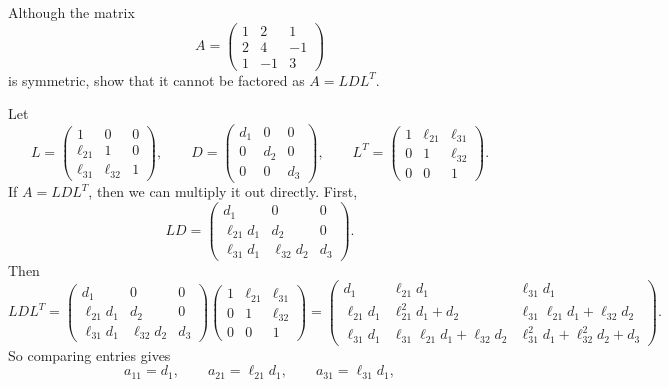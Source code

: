 \documentclass[10pt]{extarticle}
\begin{document}
\newpage

\begin{problem}[Problem 4]
Although the matrix
\[
A=
\begin{pmatrix}
1 & 2 & 1\\
2 & 4 & -1\\
1 & -1 & 3
\end{pmatrix}
\]
is symmetric, show that it cannot be factored as $A=LDL^T$.
\end{problem}

Let
\[
L=
\begin{pmatrix}
1 & 0 & 0\\
\ell_{21} & 1 & 0\\
\ell_{31} & \ell_{32} & 1
\end{pmatrix},
\qquad
D=
\begin{pmatrix}
d_1 & 0 & 0\\
0 & d_2 & 0\\
0 & 0 & d_3
\end{pmatrix},
\qquad
L^T=
\begin{pmatrix}
1 & \ell_{21} & \ell_{31}\\
0 & 1 & \ell_{32}\\
0 & 0 & 1
\end{pmatrix}.
\]
If $A=LDL^T$, then we can multiply it out directly. First,
\[
LD=
\begin{pmatrix}
d_1 & 0 & 0\\
\ell_{21}d_1 & d_2 & 0\\
\ell_{31}d_1 & \ell_{32}d_2 & d_3
\end{pmatrix}.
\]
Then
\[
LDL^T=
\begin{pmatrix}
d_1 & 0 & 0\\
\ell_{21}d_1 & d_2 & 0\\
\ell_{31}d_1 & \ell_{32}d_2 & d_3
\end{pmatrix}
\begin{pmatrix}
1 & \ell_{21} & \ell_{31}\\
0 & 1 & \ell_{32}\\
0 & 0 & 1
\end{pmatrix}
=
\begin{pmatrix}
d_1 & \ell_{21}d_1 & \ell_{31}d_1\\
\ell_{21}d_1 & \ell_{21}^2d_1+d_2 & \ell_{31}\ell_{21}d_1+\ell_{32}d_2\\
\ell_{31}d_1 & \ell_{31}\ell_{21}d_1+\ell_{32}d_2 & \ell_{31}^2d_1+\ell_{32}^2d_2+d_3
\end{pmatrix}.
\]
So comparing entries gives
\[
a_{11}=d_1,\qquad a_{21}=\ell_{21}d_1,\qquad a_{31}=\ell_{31}d_1,
\]
\end{document}
